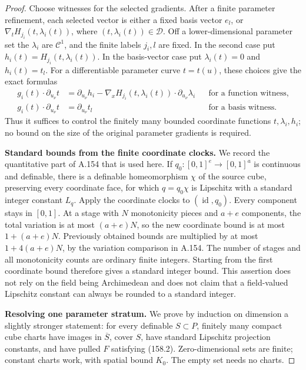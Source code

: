 \begin{proof}
Choose witnesses for the selected gradients. After a finite
parameter refinement, each selected vector is either a fixed
basis vector \(e_l\), or
\(\nabla_tH_{j_i}(t,\lambda_i(t))\), where
\((t,\lambda_i(t))\in\mathcal D\). Off a lower-dimensional
parameter set the \(\lambda_i\) are \(\mathcal C^1\), and the
finite labels \(j_i,l\) are fixed. In the second case put
\(h_i(t)=H_{j_i}(t,\lambda_i(t))\). In the basis-vector case put
\(\lambda_i(t)=0\) and \(h_i(t)=t_l\).
For a differentiable parameter curve \(t=t(u)\), these choices
give the exact formulas
\[
 \begin{aligned}
 g_i(t)\cdot\partial_{u_\nu}t
 &=\partial_{u_\nu}h_i
   -\nabla_xH_{j_i}(t,\lambda_i(t))
                  \cdot\partial_{u_\nu}\lambda_i
      &&\text{for a function witness},\\
 g_i(t)\cdot\partial_{u_\nu}t
 &=\partial_{u_\nu}t_l
      &&\text{for a basis witness}.
 \end{aligned}
 \tag{158.7}
\]
Thus it suffices to control the finitely many bounded coordinate
functions \(t,\lambda_i,h_i\); no bound on the size of the original
parameter gradients is required.

\textbf{Standard bounds from the finite coordinate clocks.}
We record the quantitative part of A.154 that is used here.
If \(q_0:[0,1]^e\to[0,1]^a\) is continuous and definable, there is
a definable homeomorphism \(\chi\) of the source cube, preserving
every coordinate face, for which \(q=q_0\chi\) is Lipschitz with
a standard integer constant \(L_q\). Apply the coordinate clocks
to \((\operatorname{id},q_0)\). Every component stays in \([0,1]\).
At a stage with \(N\) monotonicity pieces and \(a+e\) components,
the total variation is at most \((a+e)N\), so the new coordinate
bound is at most \(1+(a+e)N\). Previously obtained bounds are
multiplied by at most \(1+4(a+e)N\), by the variation comparison
in A.154. The number of stages and all monotonicity counts are
ordinary finite integers. Starting from the first coordinate
bound therefore gives a standard integer bound. This assertion
does not rely on the field being Archimedean and does not claim
that a field-valued Lipschitz constant can always be rounded to
a standard integer.

\textbf{Resolving one parameter stratum.}
We prove by induction on dimension a slightly stronger statement:
for every definable \(S\subset P\), finitely many compact cube
charts have images in \(\overline S\), cover \(S\), have standard
Lipschitz projection constants, and have pulled \(F\) satisfying
(158.2). Zero-dimensional sets are finite; constant charts work,
with spatial bound \(K_0\). The empty set needs no charts.


\end{proof}
